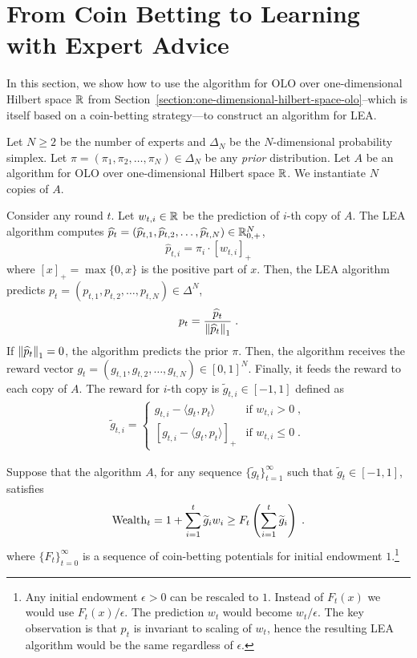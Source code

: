 \section{From Coin Betting to Learning with Expert Advice}
\label{section:reduction-experts}

In this section, we show how to use the algorithm for OLO over one-dimensional
Hilbert space $\mathbb{R}$ from
Section~\ref{section:one-dimensional-hilbert-space-olo}--which is itself based
on a coin-betting strategy---to construct an algorithm for \ac{LEA}.

Let $N \ge 2$ be the number of experts and $\Delta_N$ be the $N$-dimensional
probability simplex. Let $\pi = (\pi_1, \pi_2, \dots, \pi_N) \in \Delta_N$ be
any \emph{prior} distribution. Let $A$ be an algorithm for OLO over
one-dimensional Hilbert space $\mathbb{R}$. We instantiate $N$ copies of $A$.

Consider any round $t$. Let $w_{t,i} \in \mathbb{R}$ be the prediction of $i$-th copy of
$A$. The LEA algorithm computes $\widehat p_t = (\widehat p_{t,1}, \widehat
p_{t,2}, \dots, \widehat p_{t,N}) \in \mathbb{R}_{0,+}^N$,
\[
\widehat p_{t,i} = \pi_i \cdot [w_{t,i}]_+
\]
where $[x]_+ = \max\{0,x\}$ is the positive part of $x$. Then, the LEA
algorithm predicts $p_t = (p_{t,1}, p_{t,2}, \dots, p_{t,N}) \in \Delta^N$,
\[
p_t = \frac{\widehat p_t}{\left\|{\widehat p_t}\right\|_1} \; .
\]
If $\left\|{\widehat p_t}\right\|_1 = 0$, the algorithm predicts the prior $\pi$.
Then, the algorithm receives the reward vector
$g_t = (g_{t,1}, g_{t,2}, \dots, g_{t,N}) \in [0,1]^N$. Finally, it
feeds the reward to each copy of $A$. The reward for $i$-th copy is $\widetilde g_{t,i} \in
[-1,1]$ defined as
\begin{align}
\label{eq:gradients_experts_reduction}
\widetilde g_{t,i} =
\begin{cases}
g_{t,i} - \langle g_t, p_t \rangle & \text{if } w_{t,i} > 0 \; , \\
\left[g_{t,i} - \langle g_t, p_t \rangle \right]_+ & \text{if } w_{t,i} \le 0 \; .
\end{cases}
\end{align}

Suppose that the algorithm $A$, for any sequence
$\{\widetilde g_t\}_{t=1}^\infty$ such that $\widetilde g_t \in [-1,1]$, satisfies
\begin{equation}
\label{equation:experts-one-dimensional-assumption}
\operatorname{Wealth}_t = 1 + \sum_{i=1}^t \widetilde g_i w_i \ge F_t\left(\sum_{i=1}^t \widetilde g_i\right) \; .
\end{equation}
where $\{F_t\}_{t=0}^\infty$ is a sequence of coin-betting potentials for
initial endowment $1$.\footnote{Any initial endowment $\epsilon > 0$ can be
rescaled to $1$. Instead of $F_t(x)$ we would use $F_t(x)/\epsilon$. The
prediction $w_t$ would become $w_t/\epsilon$. The key observation is that $p_t$
is invariant to scaling of $w_t$, hence the resulting LEA algorithm would be
the same regardless of $\epsilon$.}

